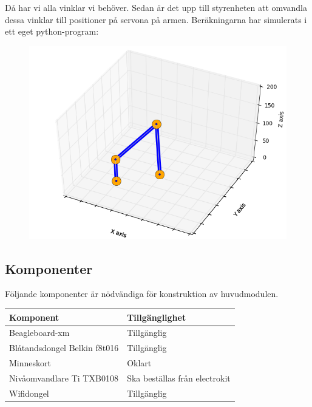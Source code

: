 Då har vi alla vinklar vi behöver. Sedan är det upp till styrenheten att omvandla dessa vinklar till positioner på servona på armen.
Beräkningarna har simulerats i ett eget python-program:
\begin{figure}[h]
\includegraphics[scale=0.6]{simulator}
\caption{}
\end{figure}
\subsection{Komponenter}
Följande komponenter är nödvändiga för konstruktion av huvudmodulen.\\
\begin{tabularx}{\textwidth}{| l | X |}
	\hline
	{\textbf{Komponent}} & {\textbf{Tillgänglighet}} \\\hline
	{Beagleboard-xm} & {Tillgänglig} \\\hline
	{Blåtandsdongel Belkin f8t016} & {Tillgänglig} \\\hline
	{Minneskort} & {Oklart} \\\hline
	{Nivåomvandlare Ti TXB0108} & {Ska beställas från electrokit\cite{nivaomvandlare}} \\\hline
	{Wifidongel} & {Tillgänglig} \\\hline
\end{tabularx}
